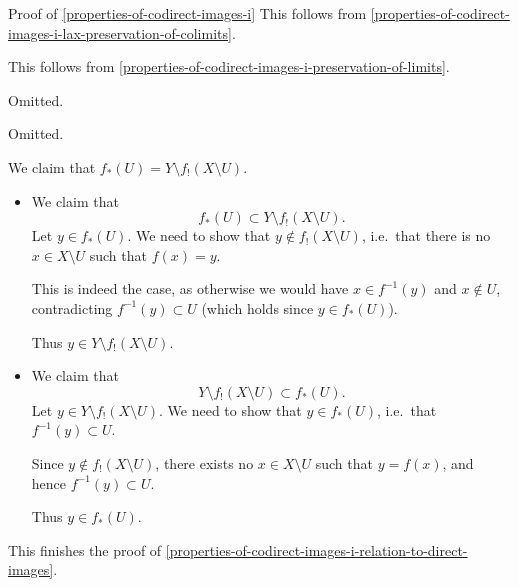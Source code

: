 \begin{Proof}{Proof of \cref{properties-of-codirect-images-i}}
    This follows from \cref{properties-of-codirect-images-i-lax-preservation-of-colimits}.

    This follows from \cref{properties-of-codirect-images-i-preservation-of-limits}.

    Omitted.

    Omitted.

    We claim that $f_{*}(U)=Y\setminus f_{!}(X\setminus U)$.
    \begin{itemize}
        \item{}We claim that
            \[
                f_{*}(U)%
                \subset%
                Y\setminus f_{!}(X\setminus U).%
            \]%
            Let $y\in f_{*}(U)$. We need to show that $y\nin f_{!}(X\setminus U)$, i.e.\ that there is no $x\in X\setminus U$ such that $f(x)=y$.

            This is indeed the case, as otherwise we would have $x\in f^{-1}(y)$ and $x\nin U$, contradicting $f^{-1}(y)\subset U$ (which holds since $y\in f_{*}(U)$).

            Thus $y\in Y\setminus f_{!}(X\setminus U)$.
        \item{}We claim that
            \[
                Y\setminus f_{!}(X\setminus U)%
                \subset%
                f_{*}(U).%
            \]%
            Let $y\in Y\setminus f_{!}(X\setminus U)$. We need to show that $y\in f_{*}(U)$, i.e.\ that $f^{-1}(y)\subset U$.

            Since $y\nin f_{!}(X\setminus U)$, there exists no $x\in X\setminus U$ such that $y=f(x)$, and hence $f^{-1}(y)\subset U$.

            Thus $y\in f_{*}(U)$.
    \end{itemize}
    This finishes the proof of \cref{properties-of-codirect-images-i-relation-to-direct-images}.


\end{Proof}

